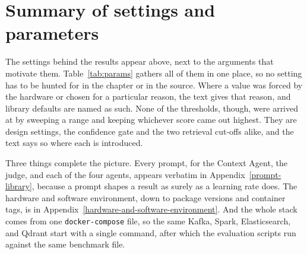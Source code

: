 \section{Summary of settings and parameters}\label{reproducibility-summary}

The settings behind the results appear above, next to the arguments that motivate them. Table~\ref{tab:params} gathers all of them in one place, so no setting has to be hunted for in the chapter or in the source. Where a value was forced by the hardware or chosen for a particular reason, the text gives that reason, and library defaults are named as such. None of the thresholds, though, were arrived at by sweeping a range and keeping whichever score came out highest. They are design settings, the confidence gate and the two retrieval cut-offs alike, and the text says so where each is introduced.

Three things complete the picture. Every prompt, for the Context Agent, the judge, and each of the four agents, appears verbatim in Appendix~\ref{prompt-library}, because a prompt shapes a result as surely as a learning rate does. The hardware and software environment, down to package versions and container tags, is in Appendix~\ref{hardware-and-software-environment}. And the whole stack comes from one \texttt{docker-compose} file, so the same Kafka, Spark, Elasticsearch, and Qdrant start with a single command, after which the evaluation scripts run against the same benchmark file.
\renewcommand{\arraystretch}{1.5} 

